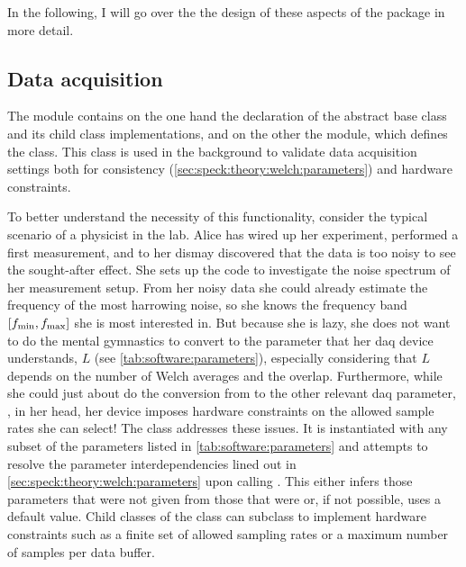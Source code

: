In the following, I will go over the the design of these aspects of the package in more detail.

\subsection{Data acquisition}\label{subsec:speck:software:design:daq}
The  module contains on the one hand the declaration of the  abstract base class and its child class implementations, and on the other the  module, which defines the  class.
This class is used in the background to validate data acquisition settings both for consistency (\cf \cref{sec:speck:theory:welch:parameters}) and hardware constraints.

To better understand the necessity of this functionality, consider the typical scenario of a physicist
in the lab.
Alice has wired up her experiment, performed a first measurement, and to her dismay discovered that the data is too noisy to see the sought-after effect.
She sets up the \pyspeck code to investigate the noise spectrum of her measurement setup.
From her noisy data she could already estimate the frequency of the most harrowing noise, so she knows the frequency band $[f_{\mathrm{min}}, f_{\mathrm{max}}]$ she is most interested in.
But because she is lazy,
she does not want to do the mental gymnastics to convert \fmin to the parameter that her \gls{daq} device understands, $L$ (see \cref{tab:software:parameters}), especially considering that $L$ depends on the number of Welch averages and the overlap.
Furthermore, while she could just about do the conversion from \fmax to the other relevant \gls{daq} parameter, \fs, in her head, her device imposes hardware constraints on the allowed sample rates she can select!
The  class addresses these issues.
It is instantiated with any subset of the parameters listed in \cref{tab:software:parameters}
and attempts to resolve the parameter interdependencies lined out in \cref{sec:speck:theory:welch:parameters} upon calling .
This either infers those parameters that were not given from those that were or, if not possible, uses a default value.
Child classes of the  class can subclass  to implement hardware constraints such as a finite set of allowed sampling rates or a maximum number of samples per data buffer.

